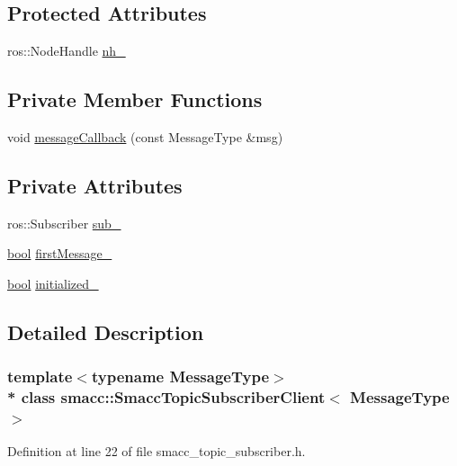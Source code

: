\subsection*{Protected Attributes}
\begin{DoxyCompactItemize}
\item 
ros\+::\+Node\+Handle \hyperlink{classsmacc_1_1SmaccTopicSubscriberClient_aed36e84de0628e1a8769be5f87664b59}{nh\+\_\+}
\end{DoxyCompactItemize}
\subsection*{Private Member Functions}
\begin{DoxyCompactItemize}
\item 
void \hyperlink{classsmacc_1_1SmaccTopicSubscriberClient_a76f1850606059b39c77d181177bba442}{message\+Callback} (const Message\+Type \&msg)
\end{DoxyCompactItemize}
\subsection*{Private Attributes}
\begin{DoxyCompactItemize}
\item 
ros\+::\+Subscriber \hyperlink{classsmacc_1_1SmaccTopicSubscriberClient_aeb481004e428a5d989f39c77321427b6}{sub\+\_\+}
\item 
\hyperlink{classbool}{bool} \hyperlink{classsmacc_1_1SmaccTopicSubscriberClient_a82a44f35d08659bba1e642650296dc5d}{first\+Message\+\_\+}
\item 
\hyperlink{classbool}{bool} \hyperlink{classsmacc_1_1SmaccTopicSubscriberClient_a12a2a96e0b93757b7eb8631da7cd6893}{initialized\+\_\+}
\end{DoxyCompactItemize}


\subsection{Detailed Description}
\subsubsection*{template$<$typename Message\+Type$>$\\*
class smacc\+::\+Smacc\+Topic\+Subscriber\+Client$<$ Message\+Type $>$}



Definition at line 22 of file smacc\+\_\+topic\+\_\+subscriber.\+h.



